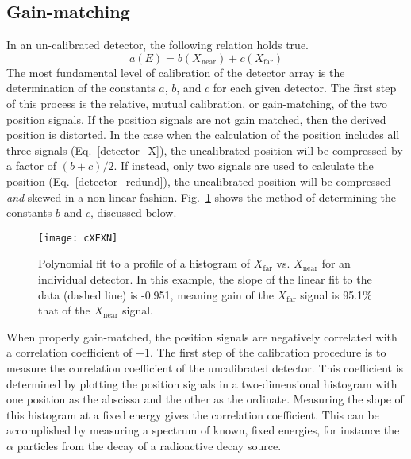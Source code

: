 \subsection{Gain-matching}
In an un-calibrated detector, the following relation holds true.
\begin{equation}
a(E)=b(X_\mathrm{near})+c(X_\mathrm{far})
\label{eq:cal}
\end{equation}
The most fundamental level of calibration of the detector array is the determination of the constants $a$, $b$, and $c$ for each given detector.  The first step of this process is the relative, mutual calibration, or gain-matching, of the two position signals.  If the position signals are not gain matched, then the derived position is distorted.  In the case when the calculation of the position includes all three signals (Eq.~\ref{detector_X}), the uncalibrated position will be compressed by a factor of $(b+c)/2$.  If instead, only two signals are used to calculate the position (Eq.~\ref{detector_redund}), the uncalibrated position will be compressed \textit{and} skewed in a non-linear fashion.  Fig.~\ref{xfxn} shows the method of determining the constants $b$ and $c$, discussed below.
\begin{figure}%
\centering
\texttt{[image: cXFXN]}%
\caption[Polynomial fit to a profile of a histogram of $X_\mathrm{far}$ vs. $X_\mathrm{near}$ for an individual detector]{Polynomial fit to a profile of a histogram of $X_\mathrm{far}$ vs. $X_\mathrm{near}$ for an individual detector.  In this example, the slope of the linear fit to the data (dashed line) is -0.951, meaning gain of the $X_\mathrm{far}$ signal is 95.1\% that of the $X_\mathrm{near}$ signal.}
\label{xfxn}%
\end{figure}

When properly gain-matched, the position signals are negatively correlated with a correlation coefficient of $-1$.  The first step of the calibration procedure is to measure the correlation coefficient of the uncalibrated detector.  This coefficient is determined by plotting the position signals in a two-dimensional histogram with one position as the abscissa and the other as the ordinate.  Measuring the slope of this histogram at a fixed energy gives the correlation coefficient.  This can be accomplished by measuring a spectrum of known, fixed energies, for instance the $\alpha$ particles from the decay of a  radioactive %
decay source.  

